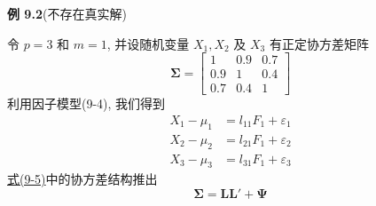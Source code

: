 \noindent\textbf{例 9.2}\quad (不存在真实解)

令 $p=3$ 和 $m=1$, 并设随机变量 $X_1,X_2$ 及 $X_3$ 有正定协方差矩阵
\[
\boldsymbol{\Sigma}=\begin{bmatrix}
1&0.9&0.7\\
0.9&1&0.4\\
0.7&0.4&1
\end{bmatrix}
\]
利用因子模型(9-4), 我们得到
\[
\begin{aligned}
X_1-\mu_1&=l_{11}F_1+\varepsilon_1\\
X_2-\mu_2&=l_{21}F_1+\varepsilon_2\\
X_3-\mu_3&=l_{31}F_1+\varepsilon_3
\end{aligned}
\]
\hyperref[eq:9-5]{式(9-5)}中的协方差结构推出
\[
\boldsymbol{\Sigma}=\mathbf{L}\mathbf{L}'+\boldsymbol{\Psi}
\]
